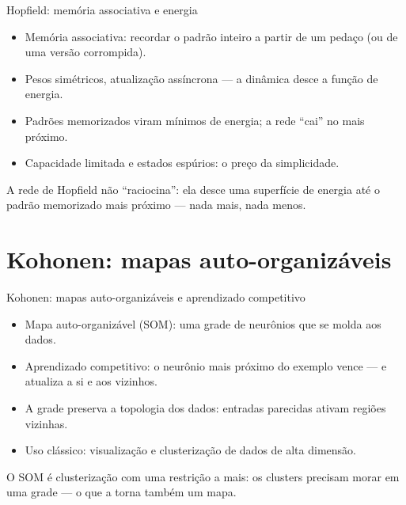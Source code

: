 \documentclass[aspectratio=169, 11pt]{beamer}
\begin{document}
\begin{frame}{Hopfield: memória associativa e energia}
  \begin{itemize}\setlength{\itemsep}{0.4ex}
    \item Memória associativa: recordar o padrão inteiro a partir de um
          pedaço (ou de uma versão corrompida).
    \item Pesos simétricos, atualização assíncrona — a dinâmica desce a
          função de energia.
    \item Padrões memorizados viram mínimos de energia; a rede ``cai'' no
          mais próximo.
    \item Capacidade limitada e estados espúrios: o preço da simplicidade.
  \end{itemize}
  \begin{alertabox}
    A rede de Hopfield não ``raciocina'': ela desce uma superfície de energia
    até o padrão memorizado mais próximo — nada mais, nada menos.
  \end{alertabox}
\end{frame}

\section{Kohonen: mapas auto-organizáveis}

\begin{frame}{Kohonen: mapas auto-organizáveis e aprendizado competitivo}
  \begin{itemize}\setlength{\itemsep}{0.4ex}
    \item Mapa auto-organizável (SOM): uma grade de neurônios que se molda
          aos dados.
    \item Aprendizado competitivo: o neurônio mais próximo do exemplo vence —
          e atualiza a si e aos vizinhos.
    \item A grade preserva a topologia dos dados: entradas parecidas ativam
          regiões vizinhas.
    \item Uso clássico: visualização e clusterização de dados de alta
          dimensão.
  \end{itemize}
  \begin{ideiabox}
    O SOM é clusterização com uma restrição a mais: os clusters precisam
    morar em uma grade — o que a torna também um mapa.
  \end{ideiabox}
\end{frame}
\end{document}
